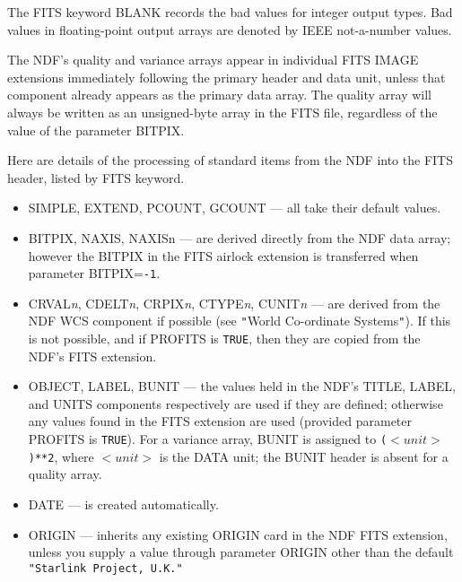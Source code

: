 \documentclass[twoside,11pt]{article}
\newcommand{\htmlref}[2]{#1}
\newcommand{\xref}[3]{#1}
\newcommand{\ssthitemlist}[1]{
  \latexonly{
  \mbox{} \\
  \vspace{-3.5ex}
  }
  \begin{itemize}
     #1
  \end{itemize}
}
\newcommand{\sstitem}{\item}
\newcommand{\sstitem}{\item}
\begin{document}
{{{         \sstitem
         The FITS keyword BLANK records the \xref{bad values}{sun95}{se_badmasking}
         for integer output types.  Bad values in floating-point output arrays are
         denoted by IEEE not-a-number values.

         \sstitem
         The NDF's quality and variance arrays appear in individual
         FITS IMAGE extensions immediately following the primary header
         and data unit, unless that component already appears as the
         primary data array.  The quality array will always be written as
         an unsigned-byte array in the FITS file, regardless of the value
         of the parameter BITPIX.

         \sstitem
         Here are details of the processing of standard items from the
         NDF into the FITS header, listed by FITS keyword.
         \ssthitemlist{

            \sstitem
            SIMPLE, EXTEND, PCOUNT, GCOUNT --- all take their default
              values.

            \sstitem
            BITPIX, NAXIS, NAXISn --- are derived directly from the NDF
              data array; however the BITPIX in the FITS airlock extension
              is transferred when parameter BITPIX=\texttt{-1}.

            \sstitem
            CRVAL\textit{n}, CDELT\textit{n}, CRPIX\textit{n}, CTYPE\textit{n},
            CUNIT\textit{n} --- are derived
              from the NDF WCS component if possible (see 
              \htmlref{\texttt{"}World Co-ordinate Systems\texttt{"}}
                 {world_coordinate_systems}).
              If this is not possible, and if PROFITS is \texttt{TRUE}, then
              they are copied from the NDF's FITS extension.

            \sstitem
            OBJECT, LABEL, BUNIT --- the values held in the NDF's TITLE,
              LABEL, and UNITS components respectively are used if
              they are defined; otherwise any values found in the FITS
              extension are used (provided parameter PROFITS is \texttt{TRUE}).
              For a variance array, BUNIT is assigned to 
              \texttt{($<unit>$)**2}, where $<unit>$ is the DATA unit; the
              BUNIT header is absent for a quality array.

            \sstitem
            DATE --- is created automatically.

            \sstitem
            ORIGIN --- inherits any existing ORIGIN card in the NDF FITS
              extension, unless you supply a value through parameter
              ORIGIN other than the default \texttt{"Starlink Project, U.K."}

}}}}
\end{document}
